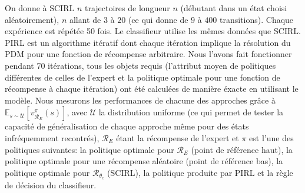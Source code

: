 \documentclass[english,utf8]{./hermes-journal}
\newcommand{\R}{\mathcal{R}}
\newcommand{\E}{\mathbb{E}}
\begin{document}
On donne à SCIRL $n$ trajectoires de longueur $n$ (débutant dans un état choisi aléatoirement), $n$ allant de  $3$ à $20$ (ce qui donne de $9$ à
$400$ transitions). Chaque expérience est répétée 50 fois. Le classifieur utilise les mêmes données que SCIRL. PIRL est un algorithme itératif dont chaque itération implique la résolution du PDM pour une fonction de récompense arbitraire. Nous l'avons fait fonctionner pendant 70 itérations, tous les objets requis (l'attribut moyen de politiques différentes de celles de l'expert et la politique optimale pour une fonction de récompense à chaque itération) ont été calculées de manière éxacte en utilisant le modèle. Nous mesurons les performances de chacune des approches grâce à $\E_{s\sim \mathcal{U}}[v^\pi_{\R_E}(s)]$, avec $\mathcal{U}$
la distribution uniforme (ce qui permet de tester la capacité de généralisation de chaque approche même pour des états infréquemment recontrés), $\R_E$ étant la récompense de l'expert et $\pi$ est l'une des politiques suivantes: la politique optimale pour $\R_E$ (point de référence haut),
la politique optimale pour une récompense aléatoire (point de référence bas), la politique optimale pour $\R_{\theta_c}$ (SCIRL), la politique produite par PIRL et la règle de décision du classifieur.
\end{document}
